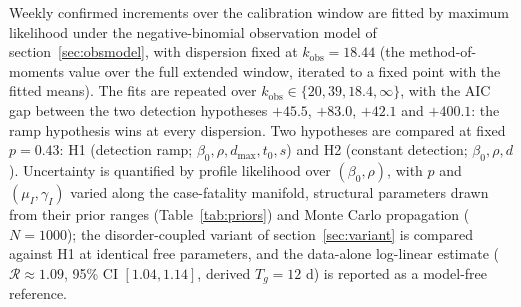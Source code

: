 \documentclass[10pt]{plos}
\newcommand{\Reff}{\mathcal{R}}
\begin{document}
Weekly confirmed increments over the calibration window are fitted by
maximum likelihood under the negative-binomial observation model of
section~\ref{sec:obsmodel}, with dispersion fixed at $k_{\mathrm{obs}}=18.44$
(the method-of-moments value over the full extended window, iterated to
a fixed point with the fitted means). The fits are
repeated over $k_{\mathrm{obs}}\in\{20,39,18.4,\infty\}$, with the AIC gap
between the two detection hypotheses $+45.5$, $+83.0$, $+42.1$ and
$+400.1$: the ramp hypothesis wins at every dispersion. Two hypotheses
are compared at fixed $p=0.43$: H1 (detection ramp; $\beta_0,\rho,d_{\max},t_0,s$)
and H2 (constant detection; $\beta_0,\rho,d$). Uncertainty is quantified
by profile likelihood over $(\beta_0,\rho)$, with $p$ and $(\mu_I,\gamma_I)$
varied along the case-fatality manifold, structural parameters drawn from
their prior ranges (Table~\ref{tab:priors}) and Monte Carlo propagation
($N=1000$); the disorder-coupled variant of section~\ref{sec:variant}
is compared against H1 at identical free parameters, and the data-alone
log-linear estimate ($\Reff\approx1.09$, 95\% CI $[1.04,1.14]$, derived
$T_g=12$ d) is reported as a model-free reference.
\end{document}
